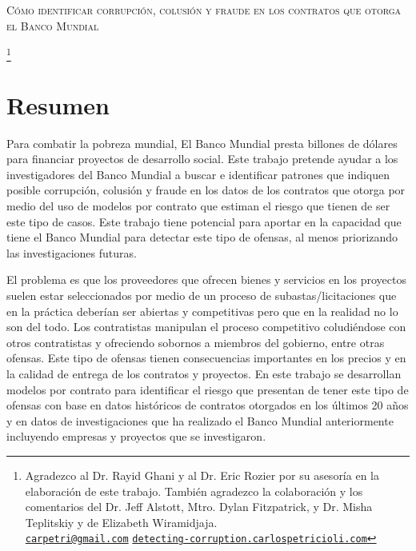 \thispagestyle{plain}
\begin{center}
\scshape \normalsize Cómo identificar corrupción, colusión y fraude en los contratos que otorga el Banco Mundial
\bigskip

\scshape \normalsize \theauthor\footnote{ \tiny Agradezco al Dr. Rayid Ghani  y al  Dr.  Eric Rozier por su asesoría en la elaboración de este trabajo. También agradezco la colaboración y los comentarios del Dr. Jeff Alstott, Mtro. Dylan Fitzpatrick, y Dr. Misha Teplitskiy y de Elizabeth Wiramidjaja.
\\  \href{mailto:carpetri@gmail.com}{\texttt{carpetri@gmail.com}}  \hfill \href{http://detecting-corruption.carlospetricioli.com}{\texttt{detecting-corruption.carlospetricioli.com}} }
\normalsize
\end{center}

\section*{\centering  \normalsize{Resumen} }
\footnotesize


Para combatir la pobreza mundial, El Banco Mundial presta billones de dólares  para financiar proyectos de desarrollo social. Este trabajo pretende ayudar a los investigadores del Banco Mundial a buscar e identificar patrones que indiquen posible corrupción, colusión y fraude en los datos de los contratos que otorga por medio del uso de modelos por contrato que estiman el riesgo que tienen de ser este tipo de casos. Este trabajo tiene potencial para aportar en la capacidad que tiene el Banco Mundial para detectar este tipo de ofensas, al menos priorizando las investigaciones futuras.

El problema es que  los proveedores que ofrecen bienes y servicios en los proyectos suelen estar seleccionados por medio de un proceso  de subastas/licitaciones que en la práctica deberían ser abiertas y competitivas pero que en la realidad no lo son del todo. Los contratistas manipulan el proceso competitivo coludiéndose con otros contratistas y ofreciendo sobornos a miembros del gobierno, entre otras ofensas. Este tipo de ofensas tienen consecuencias importantes en los precios y en la calidad de entrega de los contratos y proyectos. En este trabajo se desarrollan modelos por contrato para identificar el riesgo que presentan de tener este tipo de ofensas con base en datos históricos de contratos otorgados en los últimos 20 años y en datos de investigaciones que ha realizado el Banco Mundial anteriormente incluyendo empresas y proyectos que se investigaron. 

